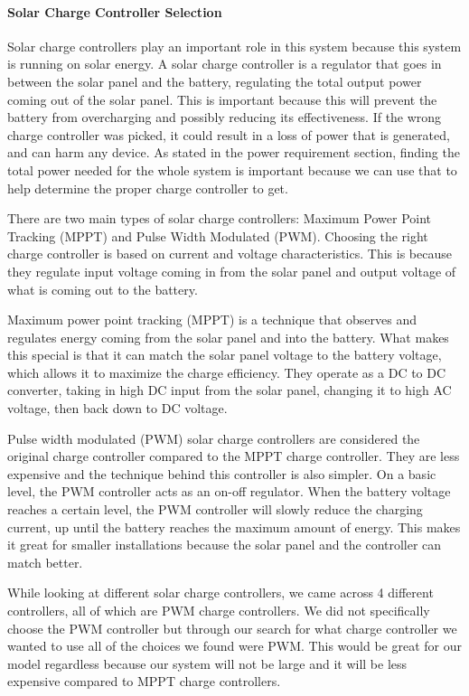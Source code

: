 \paragraph{Solar Charge Controller Selection}
Solar charge controllers play an important role in this system because this system is running on solar energy. A solar charge controller is a regulator that goes in between the solar panel and the battery, regulating the total output power coming out of the solar panel. This is important because this will prevent the battery from overcharging and possibly reducing its effectiveness. If the wrong charge controller was picked, it could result in a loss of power that is generated, and can harm any device. As stated in the power requirement section, finding the total power needed for the whole system is important because we can use that to help determine the proper charge controller to get. \par
There are two main types of solar charge controllers: Maximum Power Point Tracking (MPPT) and Pulse Width Modulated (PWM). Choosing the right charge controller is based on current and voltage characteristics. This is because they regulate input voltage coming in from the solar panel and output voltage of what is coming out to the battery.\par
Maximum power point tracking (MPPT) is a technique that observes and regulates energy coming from the solar panel and into the battery. What makes this special is that it can match the solar panel voltage to the battery voltage, which allows it to maximize the charge efficiency. They operate as a DC to DC converter, taking in high DC input from the solar panel, changing it to high AC voltage, then back down to DC voltage.\par
Pulse width modulated (PWM) solar charge controllers are considered the original charge controller compared to the MPPT charge controller. They are less expensive and the technique behind this controller is also simpler. On a basic level, the PWM controller acts as an on-off regulator. When the battery voltage reaches a certain level, the PWM controller will slowly reduce the charging current, up until the battery reaches the maximum amount of energy. This makes it great for smaller installations because the solar panel and the controller can match better. \par
While looking at different solar charge controllers, we came across 4 different controllers, all of which are PWM charge controllers. We did not specifically choose the PWM controller but through our search for what charge controller we wanted to use all of the choices we found were PWM. This would be great for our model regardless because our system will not be large and it will be less expensive compared to MPPT charge controllers.\par
